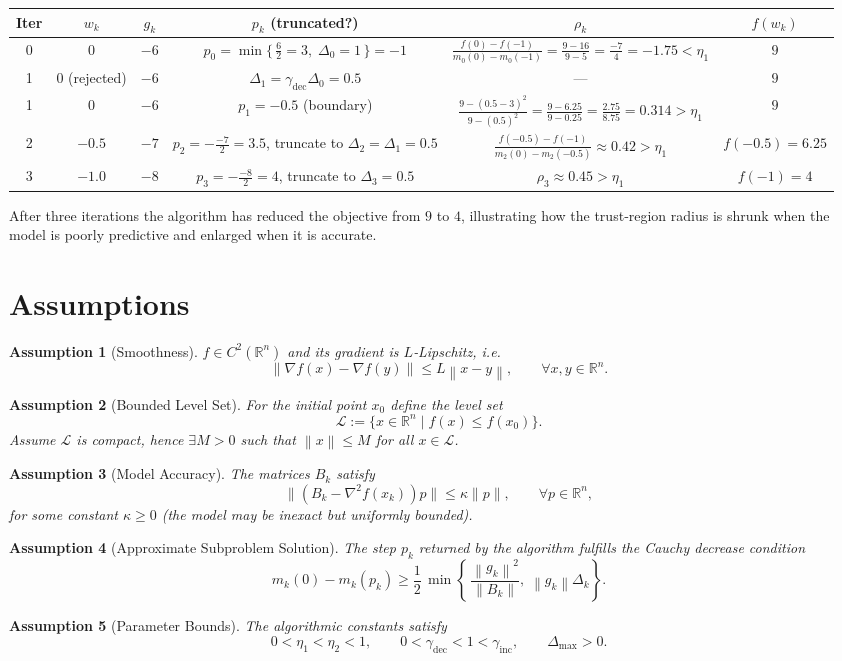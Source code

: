 \documentclass{article}
\newtheorem{assumption}{Assumption}
\newcommand{\norm}[1]{\left\lVert#1\right\rVert}
\newcommand{\R}{\mathbb{R}}
\begin{document}
\begin{center}
\begin{tabular}{c|c|c|c|c|c}
Iter & $w_k$ & $g_k$ & $p_k$ (truncated?) & $\rho_k$ & $f(w_k)$\\ \hline
0 & $0$ & $-6$ & $p_0= \min\{\,\frac{6}{2}=3,\;\Delta_0=1\,\}= -1$ &
$\displaystyle\frac{f(0)-f(-1)}{m_0(0)-m_0(-1)}= \frac{9-16}{9-5}= \frac{-7}{4}=-1.75<\eta_1$ &
$9$\\[4pt]
1 & $0$ (rejected) & $-6$ & $\Delta_1=\gamma_{\text{dec}}\Delta_0=0.5$ &
--- & $9$\\[4pt]
1 & $0$ & $-6$ & $p_1= -0.5$ (boundary) &
$\displaystyle\frac{9- (0.5-3)^2}{9-(0.5)^2}= \frac{9-6.25}{9-0.25}= \frac{2.75}{8.75}=0.314>\eta_1$ &
$9$\\[4pt]
2 & $-0.5$ & $-7$ & $p_2= -\frac{-7}{2}=3.5$, truncate to $\Delta_2=\Delta_1=0.5$ &
$\displaystyle\frac{f(-0.5)-f(-1)}{m_2(0)-m_2(-0.5)}\approx0.42>\eta_1$ &
$f(-0.5)=6.25$\\[4pt]
3 & $-1.0$ & $-8$ & $p_3= -\frac{-8}{2}=4$, truncate to $\Delta_3=0.5$ &
$\rho_3\approx0.45>\eta_1$ &
$f(-1)=4$\\
\end{tabular}
\end{center}
After three iterations the algorithm has reduced the objective from $9$ to $4$,
illustrating how the trust‑region radius is shrunk when the model is
poorly predictive and enlarged when it is accurate.

\section*{Assumptions}
\begin{assumption}[Smoothness]
\label{ass:smooth}
$f\in C^{2}(\R^{n})$ and its gradient is $L$‑Lipschitz, i.e.
\[
\norm{\nabla f(x)-\nabla f(y)}\le L\norm{x-y},\qquad\forall x,y\in\R^{n}.
\]
\end{assumption}
\begin{assumption}[Bounded Level Set]
\label{ass:bounded}
For the initial point $x_0$ define the level set
\[
\mathcal{L}:=\{x\in\R^{n}\mid f(x)\le f(x_0)\}.
\]
Assume $\mathcal{L}$ is compact, hence $\exists M>0$ such that
$\norm{x}\le M$ for all $x\in\mathcal{L}$.
\end{assumption}
\begin{assumption}[Model Accuracy]
\label{ass:model}
The matrices $B_k$ satisfy
\[
\| (B_k-\nabla^{2}f(x_k))p\|\le \kappa\|p\|,\qquad\forall p\in\R^{n},
\]
for some constant $\kappa\ge0$ (the model may be inexact but uniformly
bounded).
\end{assumption}
\begin{assumption}[Approximate Subproblem Solution]
\label{ass:approx}
The step $p_k$ returned by the algorithm fulfills the Cauchy decrease
condition
\[
m_k(0)-m_k(p_k)\ge \frac{1}{2}\,\min\!\left\{\,\frac{\norm{g_k}^{2}}{\|B_k\|},
\;\norm{g_k}\Delta_k\right\}.
\]
\end{assumption}
\begin{assumption}[Parameter Bounds]
\label{ass:param}
The algorithmic constants satisfy
\[
0<\eta_1<\eta_2<1,\qquad 0<\gamma_{\text{dec}}<1<\gamma_{\text{inc}},\qquad
\Delta_{\max}>0.
\]
\end{assumption}
\end{document}
